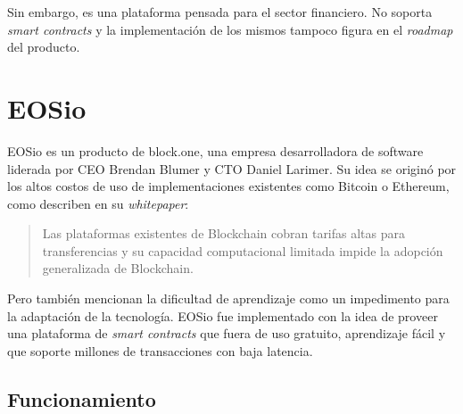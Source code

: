 Sin embargo, es una plataforma pensada para el sector financiero. No soporta \textit{smart contracts} y la implementación de los mismos tampoco figura en el \textit{roadmap} del producto.

\section{EOSio}

EOSio es un producto de block.one, una empresa desarrolladora de software liderada por CEO Brendan Blumer y CTO Daniel Larimer.
Su idea se originó por los altos costos de uso de implementaciones existentes como Bitcoin o Ethereum, como describen en su \textit{whitepaper}:

\begin{quote}
Las plataformas existentes de Blockchain cobran tarifas altas para transferencias y su capacidad computacional limitada impide la adopción generalizada de Blockchain.\cite{eosio_tech_whitepaper}
\end{quote}
Pero también mencionan la dificultad de aprendizaje como un impedimento para la adaptación de la tecnología. EOSio fue implementado con la idea de proveer una plataforma de \textit{smart contracts} que fuera de uso gratuito, aprendizaje fácil y que soporte millones de transacciones con baja latencia.

\subsection{Funcionamiento}

